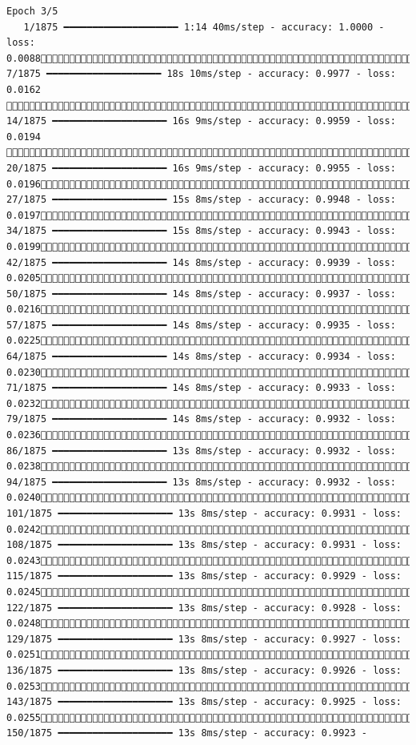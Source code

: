 \documentclass[
  letterpaper,
  DIV=11,
  numbers=noendperiod]{scrreprt}
\begin{document}
\begin{verbatim}
Epoch 3/5
   1/1875 ━━━━━━━━━━━━━━━━━━━━ 1:14 40ms/step - accuracy: 1.0000 - loss: 0.0088   7/1875 ━━━━━━━━━━━━━━━━━━━━ 18s 10ms/step - accuracy: 0.9977 - loss: 0.0162   14/1875 ━━━━━━━━━━━━━━━━━━━━ 16s 9ms/step - accuracy: 0.9959 - loss: 0.0194   20/1875 ━━━━━━━━━━━━━━━━━━━━ 16s 9ms/step - accuracy: 0.9955 - loss: 0.0196  27/1875 ━━━━━━━━━━━━━━━━━━━━ 15s 8ms/step - accuracy: 0.9948 - loss: 0.0197  34/1875 ━━━━━━━━━━━━━━━━━━━━ 15s 8ms/step - accuracy: 0.9943 - loss: 0.0199  42/1875 ━━━━━━━━━━━━━━━━━━━━ 14s 8ms/step - accuracy: 0.9939 - loss: 0.0205  50/1875 ━━━━━━━━━━━━━━━━━━━━ 14s 8ms/step - accuracy: 0.9937 - loss: 0.0216  57/1875 ━━━━━━━━━━━━━━━━━━━━ 14s 8ms/step - accuracy: 0.9935 - loss: 0.0225  64/1875 ━━━━━━━━━━━━━━━━━━━━ 14s 8ms/step - accuracy: 0.9934 - loss: 0.0230  71/1875 ━━━━━━━━━━━━━━━━━━━━ 14s 8ms/step - accuracy: 0.9933 - loss: 0.0232  79/1875 ━━━━━━━━━━━━━━━━━━━━ 14s 8ms/step - accuracy: 0.9932 - loss: 0.0236  86/1875 ━━━━━━━━━━━━━━━━━━━━ 13s 8ms/step - accuracy: 0.9932 - loss: 0.0238  94/1875 ━━━━━━━━━━━━━━━━━━━━ 13s 8ms/step - accuracy: 0.9932 - loss: 0.0240 101/1875 ━━━━━━━━━━━━━━━━━━━━ 13s 8ms/step - accuracy: 0.9931 - loss: 0.0242 108/1875 ━━━━━━━━━━━━━━━━━━━━ 13s 8ms/step - accuracy: 0.9931 - loss: 0.0243 115/1875 ━━━━━━━━━━━━━━━━━━━━ 13s 8ms/step - accuracy: 0.9929 - loss: 0.0245 122/1875 ━━━━━━━━━━━━━━━━━━━━ 13s 8ms/step - accuracy: 0.9928 - loss: 0.0248 129/1875 ━━━━━━━━━━━━━━━━━━━━ 13s 8ms/step - accuracy: 0.9927 - loss: 0.0251 136/1875 ━━━━━━━━━━━━━━━━━━━━ 13s 8ms/step - accuracy: 0.9926 - loss: 0.0253 143/1875 ━━━━━━━━━━━━━━━━━━━━ 13s 8ms/step - accuracy: 0.9925 - loss: 0.0255 150/1875 ━━━━━━━━━━━━━━━━━━━━ 13s 8ms/step - accuracy: 0.9923 - 
\end{verbatim}
\end{document}
